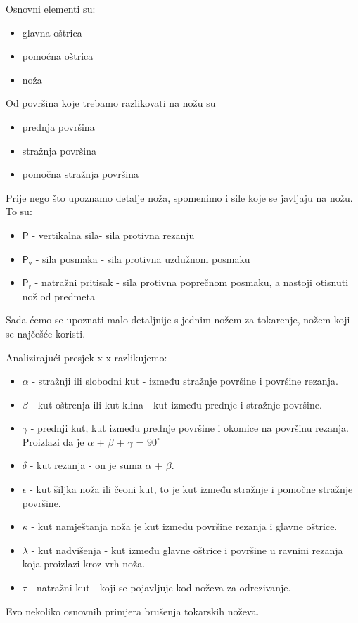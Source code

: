 \documentclass[a4paper,12pt]{article}
\numberwithin{figure}{section}
\begin{document}
Osnovni elementi su:
\begin{itemize}
\item glavna oštrica
\item pomoćna oštrica
\item noža
\end{itemize}
Od površina koje trebamo razlikovati na nožu su
\begin{itemize}
\item prednja površina
\item stražnja površina
\item pomočna stražnja površina
\end{itemize}
Prije nego što upoznamo detalje noža, spomenimo i sile koje se javljaju na nožu. To su:
\begin{itemize}
\item $\mathsf{P}$ - vertikalna sila- sila protivna rezanju
\item $\mathsf{P_{v}}$ - sila posmaka - sila protivna uzdužnom posmaku
\item $\mathsf{P_{r}}$ - natražni pritisak - sila protivna poprečnom posmaku, a nastoji otisnuti nož od predmeta
\end{itemize}
Sada ćemo se upoznati malo detaljnije s jednim nožem za tokarenje, nožem koji se najčešće koristi.


Analizirajući presjek x-x razlikujemo:
\begin{itemize}
\item $\alpha$ - stražnji ili slobodni kut - između stražnje površine i površine rezanja. 
\item $\beta$ - kut oštrenja ili kut klina - kut između prednje i stražnje površine.
\item $\gamma$ - prednji kut, kut između prednje površine i okomice na površinu rezanja. Proizlazi da je $\alpha$ + $\beta$ + $\gamma$ = $90^{\circ}$
\item $\delta$ - kut rezanja - on je suma $\alpha$ + $\beta$.
\item $\epsilon$ - kut šiljka noža ili čeoni kut, to je kut između stražnje i pomočne stražnje površine.
\item $\kappa$ - kut namještanja noža je kut između površine rezanja i glavne oštrice.
\item $\lambda$ - kut nadvišenja - kut između glavne oštrice i površine u ravnini rezanja koja proizlazi kroz vrh noža.
\item $\tau$ - natražni kut - koji se pojavljuje kod noževa za odrezivanje.
\end{itemize}
Evo nekoliko osnovnih primjera brušenja tokarskih noževa.
\end{document}

